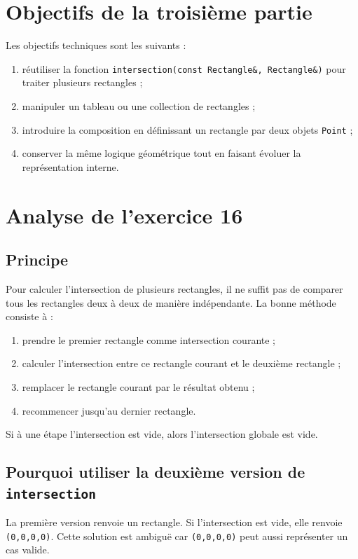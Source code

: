 \documentclass[12pt,a4paper]{article}
\begin{document}
\section{Objectifs de la troisi\`eme partie}
Les objectifs techniques sont les suivants :
\begin{enumerate}[leftmargin=*]
    \item r\'eutiliser la fonction \texttt{intersection(const Rectangle\&, Rectangle\&)} pour traiter plusieurs rectangles ;
    \item manipuler un tableau ou une collection de rectangles ;
    \item introduire la composition en d\'efinissant un rectangle par deux objets \texttt{Point} ;
    \item conserver la m\^eme logique g\'eom\'etrique tout en faisant \'evoluer la repr\'esentation interne.
\end{enumerate}

\section{Analyse de l'exercice 16}
\subsection{Principe}
Pour calculer l'intersection de plusieurs rectangles, il ne suffit pas de comparer tous les rectangles deux \`a deux de mani\`ere ind\'ependante. La bonne m\'ethode consiste \`a :
\begin{enumerate}[leftmargin=*]
    \item prendre le premier rectangle comme intersection courante ;
    \item calculer l'intersection entre ce rectangle courant et le deuxi\`eme rectangle ;
    \item remplacer le rectangle courant par le r\'esultat obtenu ;
    \item recommencer jusqu'au dernier rectangle.
\end{enumerate}

Si \`a une \'etape l'intersection est vide, alors l'intersection globale est vide.

\subsection{Pourquoi utiliser la deuxi\`eme version de \texttt{intersection}}
La premi\`ere version renvoie un rectangle. Si l'intersection est vide, elle renvoie \texttt{(0,0,0,0)}. Cette solution est ambigu\"e car \texttt{(0,0,0,0)} peut aussi repr\'esenter un cas valide.
\end{document}
